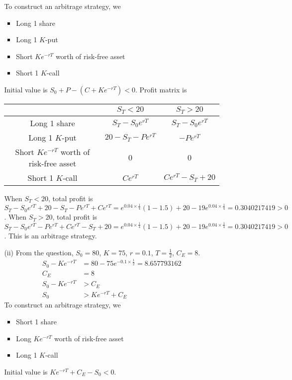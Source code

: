 \documentclass{article}
\begin{document}
\begin{enumerate}
\begin{itemize}
\begin{itemize}
To construct an arbitrage strategy, we
\begin{itemize}
    \item Long 1 share
    \item Long 1 $K$-put
    \item Short $Ke^{-rT}$ worth of risk-free asset
    \item Short 1 $K$-call
\end{itemize}
Initial value is $S_0+P-(C+Ke^{-rT})<0$.
\newline
Profit matrix is
\begin{center}
\begin{tabular} { |c|c|c| }
\hline
 & $S_T<20$ & $S_T>20$ \\
 \hline
 Long 1 share & $S_T-S_0e^{rT}$ & $S_T-S_0e^{rT}$ \\
 \hline
 Long 1 $K$-put & $20-S_T-Pe^{rT}$ & $-Pe^{rT}$ \\
 \hline
 Short $Ke^{-rT}$ worth of risk-free asset & 0 & 0 \\
 \hline
 Short 1 $K$-call & $Ce^{rT}$ & $Ce^{rT}-S_T+20$ \\
 \hline
 \end{tabular}
\end{center}
When $S_T<20$, total profit is $S_T-S_0e^{rT}+20-S_T-Pe^{rT}+Ce^{rT}=e^{0.04\times \frac{1}{4}}(1-1.5)+20-19e^{0.04\times \frac{1}{4}}=0.3040217419>0$.
\newline
When $S_T>20$, total profit is $S_T-S_0e^{rT}-Pe^{rT}+Ce^{rT}-S_T+20=e^{0.04\times \frac{1}{4}}(1-1.5)+20-19e^{0.04\times \frac{1}{4}}=0.3040217419>0$.
\newline
This is an arbitrage strategy.
\\
\item[(ii)]
From the question, $S_0=80$, $K=75$, $r=0.1$, $T=\frac{1}{2}$, $C_E=8$.
\begin{align*}
    S_0-Ke^{-rT}&=80-75e^{-0.1\times \frac{1}{2}}=8.657793162\\
    C_E&=8\\
    S_0-Ke^{-rT}&>C_E\\
    S_0&>Ke^{-rT}+C_E
\end{align*}
To construct an arbitrage strategy, we
\begin{itemize}
    \item Short 1 share
    \item Long $Ke^{-rT}$ worth of risk-free asset
    \item Long 1 $K$-call
\end{itemize}
Initial value is $Ke^{-rT}+C_E-S_0<0$.

\end{itemize}
\end{itemize}
\end{enumerate}
\end{document}
